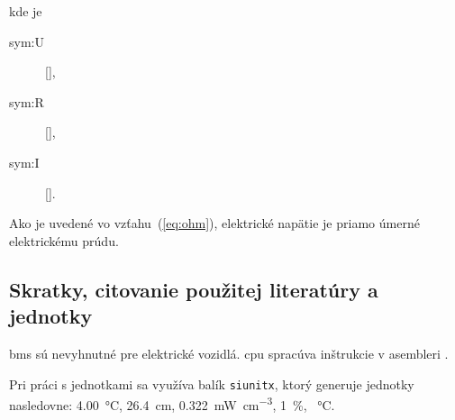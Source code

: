 kde je

\begin{description}
	\item[\gls{sym:U}]  [],
	\item[\gls{sym:R}]  [],
	\item[\gls{sym:I}]  [].
\end{description}


Ako je uvedené vo vzťahu~(\ref{eq:ohm}), elektrické napätie je priamo úmerné elektrickému prúdu.

\subsection{Skratky, citovanie použitej literatúry a jednotky}

\gls{bms} sú nevyhnutné pre elektrické vozidlá. \gls{cpu} spracúva inštrukcie v asembleri \cite{nuclear_fission_uranium_235, JAYABAL2024103121}.

Pri práci s jednotkami sa využíva balík \texttt{siunitx}, ktorý generuje jednotky nasledovne: \SI{4.00}{\celsius}, \SI{26.4}{\centi\metre}, \SI{0.322}{\milli\watt\per\cubic\centi\metre}, \SI{1}{\percent}, \SI{}{\celsius}.